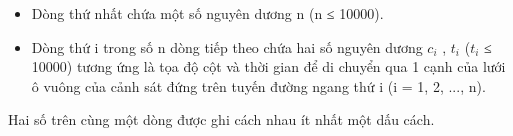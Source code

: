 \begin{itemize}
	\item Dòng thứ nhất chứa một số nguyên dương n (n ≤ 10000).
	\item Dòng thứ i trong số n dòng tiếp theo chứa hai số nguyên dương $c_{i}$ , $t_{i}$ ($t_{i}$ ≤ 10000) tương ứng là tọa độ cột và thời gian để di chuyển qua 1 cạnh của lưới ô vuông của cảnh sát đứng trên tuyến đường ngang thứ i (i = 1, 2, ..., n).
\end{itemize}

Hai số trên cùng một dòng được ghi cách nhau ít nhất một dấu cách.